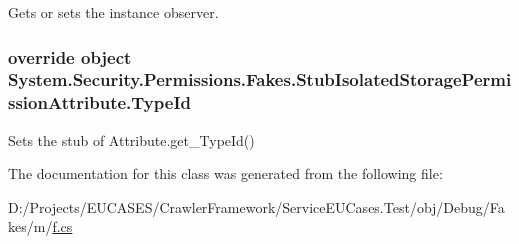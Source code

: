 Gets or sets the instance observer.

\hypertarget{class_system_1_1_security_1_1_permissions_1_1_fakes_1_1_stub_isolated_storage_permission_attribute_a309ae8987338ce72c88bfcfb0aafa6d7}{
\subsubsection[{Type\-Id}]{\setlength{\rightskip}{0pt plus 5cm}override object System.\-Security.\-Permissions.\-Fakes.\-Stub\-Isolated\-Storage\-Permission\-Attribute.\-Type\-Id\hspace{0.3cm}{\ttfamily [get]}}}\label{class_system_1_1_security_1_1_permissions_1_1_fakes_1_1_stub_isolated_storage_permission_attribute_a309ae8987338ce72c88bfcfb0aafa6d7}


Sets the stub of Attribute.\-get\-\_\-\-Type\-Id()



The documentation for this class was generated from the following file\-:\begin{DoxyCompactItemize}
\item 
D\-:/\-Projects/\-E\-U\-C\-A\-S\-E\-S/\-Crawler\-Framework/\-Service\-E\-U\-Cases.\-Test/obj/\-Debug/\-Fakes/m/\hyperlink{m_2f_8cs}{f.\-cs}\end{DoxyCompactItemize}
